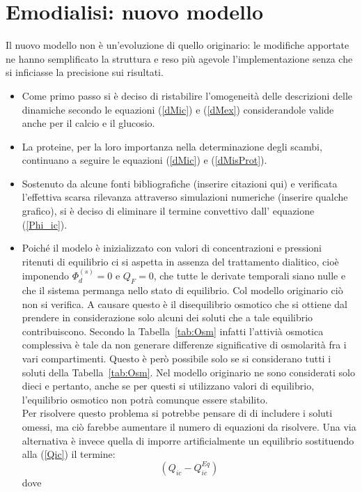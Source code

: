 \section{Emodialisi: nuovo modello}
Il nuovo modello non è un'evoluzione di quello originario: le modifiche apportate ne hanno semplificato la struttura  e reso più agevole l'implementazione senza che si inficiasse la precisione sui risultati.

\begin{itemize}
	\item Come primo passo si è deciso di ristabilire l'omogeneità delle descrizioni delle dinamiche secondo le equazioni (\ref{dMic}) e (\ref{dMex})
	 considerandole valide anche per il calcio e il glucosio.
	 \item La proteine, per la loro importanza nella determinazione degli scambi, continuano a seguire le equazioni (\ref{dMic}) e (\ref{dMisProt}).
	 \item Sostenuto da alcune fonti bibliografiche (inserire citazioni qui) e verificata l'effettiva scarsa rilevanza attraverso simulazioni numeriche (inserire qualche grafico), si è deciso di eliminare    il termine convettivo dall' equazione (\ref{Phi_ic}).
	 \item Poiché il modelo è inizializzato con valori di concentrazioni e pressioni ritenuti di equilibrio ci si aspetta in assenza del trattamento
	  dialitico, cioè imponendo $\Phi_d^{(s)}=0$ e $Q_F=0$, che tutte le derivate temporali siano nulle e che il sistema permanga nello stato di
	  equilibrio. Col modello originario ciò non si verifica. A causare questo è il disequilibrio osmotico che si ottiene dal prendere in considerazione      solo alcuni dei soluti che a tale equilibrio contribuiscono. Secondo la Tabella~\ref{tab:Osm} infatti l'attivià osmotica complessiva è tale da          non generare differenze significative di osmolarità fra i vari compartimenti. Questo è però possibile solo se si considerano tutti i soluti della       Tabella~\ref{tab:Osm}. Nel modello originario ne sono considerati solo dieci e pertanto, anche se per
	  questi si utilizzano valori di equilibrio, l'equilibrio osmotico non potrà comunque essere stabilito.\\
	  Per risolvere questo problema si potrebbe pensare di di includere i soluti omessi, ma ciò farebbe aumentare il numero di equazioni da risolvere.        Una via alternativa è invece quella di imporre artificialmente un equilibrio sostituendo alla (\ref{Qic}) il termine:
	  $$
	  	(Q_{ic}-Q_{ic}^{Eq})
	  $$ 
	  dove 
	  \begin{gather*}

\end{gather*}
\end{itemize}
